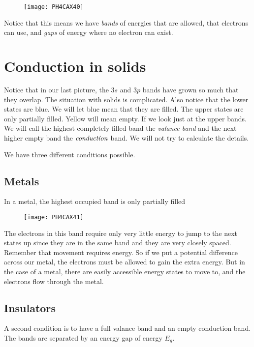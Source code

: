 \bigskip \begin{figure}[h!]
\texttt{[image: PH4CAX40]}
\end{figure}

Notice that this means we have \emph{bands} of energies that are allowed,
that electrons can use, and \emph{gaps} of energy where no electron can
exist.

\section{Conduction in solids}

Notice that in our last picture, the $3s$ and $3p$ bands have grown so much
that they overlap. The situation with solids is complicated. Also notice
that the lower states are blue. We will let blue mean that they are filled.
The upper states are only partially filled. Yellow will mean empty. If we
look just at the upper bands. We will call the highest completely filled
band the \emph{valance band} and the next higher empty band the $\emph{%
conduction}$ band. We will not try to calculate the details.

We have three different conditions possible.

\subsection{Metals}

In a metal, the highest occupied band is only partially filled

\begin{figure}[h!]
\texttt{[image: PH4CAX41]}
\end{figure}

The electrons in this band require only very little energy to jump to the
next states up since they are in the same band and they are very closely
spaced. Remember that movement requires energy. So if we put a potential
difference across our metal, the electrons must be allowed to gain the extra
energy. But in the case of a metal, there are easily accessible energy
states to move to, and the electrons flow through the metal.

\subsection{Insulators}

A second condition is to have a full valance band and an empty conduction
band. The bands are separated by an energy gap of energy $E_{g}.$

